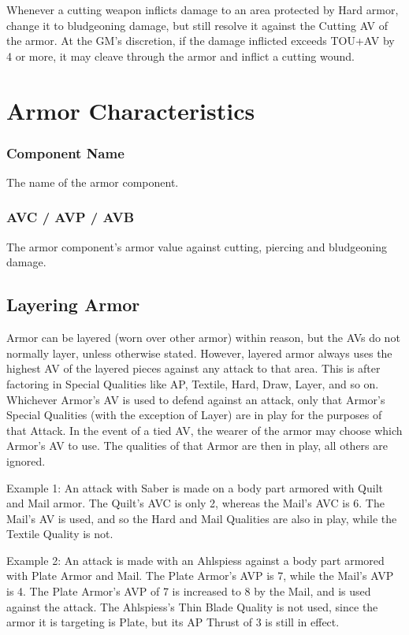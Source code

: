 \documentclass[oneside,11pt,english]{book}
\begin{document}
Whenever a cutting weapon inflicts damage to an area protected by Hard armor, change it to bludgeoning damage, but
still resolve it against the Cutting AV of the armor. At the GM’s discretion, if the damage inflicted exceeds TOU+AV 
by 4 or more, it may cleave through the armor and inflict a cutting wound.


\section{Armor Characteristics}

\subsubsection{Component Name}
The name of the armor component.

\subsubsection{AVC / AVP / AVB}
The armor component’s armor value against cutting, piercing and bludgeoning damage.

\subsection{Layering Armor}
Armor can be layered (worn over other armor) within reason, but the AVs do not normally layer, unless otherwise 
stated. However, layered armor always uses the highest AV of the layered pieces against any attack to that area. This is
after factoring in Special Qualities like AP, Textile, Hard, Draw, Layer, and so on.
Whichever Armor’s AV is used to defend against an attack, only that Armor’s Special Qualities (with the exception of 
Layer) are in play for the purposes of that Attack. In the event of a tied AV, the wearer of the armor may choose which 
Armor’s AV to use. The qualities of that Armor are then in play, all others are ignored.

Example 1: An attack with Saber is made on a body part armored with Quilt and Mail armor. The Quilt’s AVC is only 
2, whereas the Mail’s AVC is 6. The Mail’s AV is used, and so the Hard and Mail Qualities are also in play, while the 
Textile Quality is not.

Example 2: An attack is made with an Ahlspiess against a body part armored with Plate Armor and Mail. The Plate 
Armor’s AVP is 7, while the Mail’s AVP is 4. The Plate Armor’s AVP of 7 is increased to 8 by the Mail, and is used 
against the attack. The Ahlspiess’s Thin Blade Quality is not used, since the armor it is targeting is Plate, but its AP Thrust of 3 is still in effect.
\end{document}
